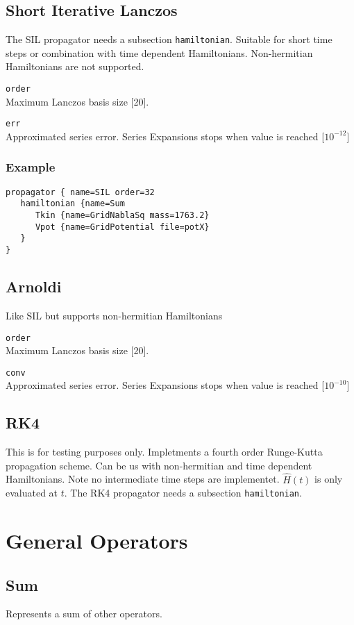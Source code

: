\documentclass[a4paper,12pt]{scrbook}
\newcommand{\option}[2]{\item \texttt{#1}\\ #2}
\begin{document}
\subsection{Short Iterative Lanczos}
The SIL propagator \cite{needed} needs a subsection \verb|hamiltonian|.
Suitable for short time steps or combination with time dependent Hamiltonians.
Non-hermitian Hamiltonians are not supported.
\begin{options}
 \option{order}{Maximum Lanczos basis size [20].}
 \option{err}{Approximated series error. Series Expansions stops when value is reached [$10^{-12}$]}
\end{options}

\subsubsection*{Example}
\begin{verbatim}
propagator { name=SIL order=32
   hamiltonian {name=Sum
      Tkin {name=GridNablaSq mass=1763.2}
      Vpot {name=GridPotential file=potX}
   }
}
\end{verbatim}

\subsection{Arnoldi}
Like SIL but supports non-hermitian Hamiltonians

\begin{options}
 \option{order}{Maximum Lanczos basis size [20].}
 \option{conv}{Approximated series error. Series Expansions stops when value is reached [$10^{-10}$]}
\end{options}

\subsection{RK4}
This is for testing purposes only. Impletments a fourth order Runge-Kutta propagation scheme.
Can be us with non-hermitian and time dependent Hamiltonians. Note no intermediate time steps
are implementet. $\hat H(t)$ is only evaluated at $t$.
The RK4 propagator \cite{needed} needs a subsection \verb|hamiltonian|.

\section{General Operators}

\subsection{Sum}
Represents a sum of other operators.
\end{document}
